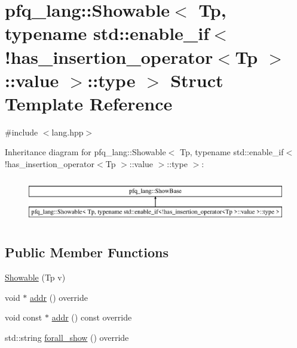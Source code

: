 \hypertarget{structpfq__lang_1_1Showable_3_01Tp_00_01typename_01std_1_1enable__if_3_9has__insertion__operator488b85264b5317ebf7312bb7e4c18409}{\section{pfq\+\_\+lang\+:\+:Showable$<$ Tp, typename std\+:\+:enable\+\_\+if$<$!has\+\_\+insertion\+\_\+operator$<$Tp $>$\+:\+:value $>$\+:\+:type $>$ Struct Template Reference}
\label{structpfq__lang_1_1Showable_3_01Tp_00_01typename_01std_1_1enable__if_3_9has__insertion__operator488b85264b5317ebf7312bb7e4c18409}
}


{\ttfamily \#include $<$lang.\+hpp$>$}

Inheritance diagram for pfq\+\_\+lang\+:\+:Showable$<$ Tp, typename std\+:\+:enable\+\_\+if$<$!has\+\_\+insertion\+\_\+operator$<$Tp $>$\+:\+:value $>$\+:\+:type $>$\+:\begin{figure}[H]
\begin{center}
\leavevmode
\includegraphics[height=1.996435cm]{structpfq__lang_1_1Showable_3_01Tp_00_01typename_01std_1_1enable__if_3_9has__insertion__operator488b85264b5317ebf7312bb7e4c18409}
\end{center}
\end{figure}
\subsection*{Public Member Functions}
\begin{DoxyCompactItemize}
\item 
\hyperlink{structpfq__lang_1_1Showable_3_01Tp_00_01typename_01std_1_1enable__if_3_9has__insertion__operator488b85264b5317ebf7312bb7e4c18409_a14ef2b4c5ba3f43c383195ee30a2f96d}{Showable} (Tp v)
\item 
void $\ast$ \hyperlink{structpfq__lang_1_1Showable_3_01Tp_00_01typename_01std_1_1enable__if_3_9has__insertion__operator488b85264b5317ebf7312bb7e4c18409_ac0ae729be089784b9665298cf3c9c573}{addr} () override
\item 
void const $\ast$ \hyperlink{structpfq__lang_1_1Showable_3_01Tp_00_01typename_01std_1_1enable__if_3_9has__insertion__operator488b85264b5317ebf7312bb7e4c18409_a0c9d446d34046f9ee4eae1da81be93c4}{addr} () const override
\item 
std\+::string \hyperlink{structpfq__lang_1_1Showable_3_01Tp_00_01typename_01std_1_1enable__if_3_9has__insertion__operator488b85264b5317ebf7312bb7e4c18409_a52c1fe66b7314c0f28d5a1137be24652}{forall\+\_\+show} () override
\end{DoxyCompactItemize}
